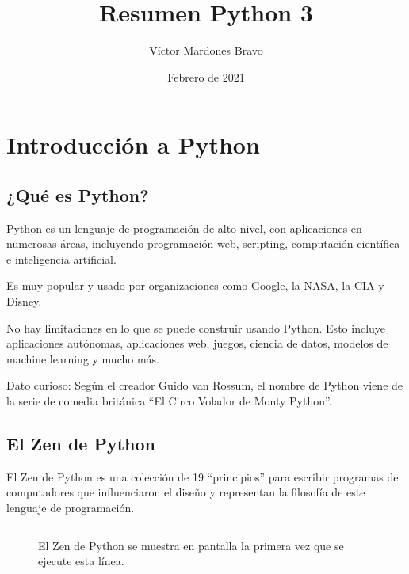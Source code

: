 \documentclass{article}
\title{Resumen Python 3}
\author{Víctor Mardones Bravo}
\date{Febrero de 2021}
\newcommand{\doble}[1]{``#1''}
\begin{document}

\null
\nointerlineskip
\vfill
\let\snewpage \newpage
\let\newpage \relax
  {\centering\def\svgwidth{\columnwidth}
  }
\maketitle
\let \newpage \snewpage
\vfill 
\break

\newpage


\section{Introducción a Python}

\subsection{¿Qué es Python?}

Python es un lenguaje de programación de alto nivel, con aplicaciones en numerosas áreas, incluyendo programación web, scripting, computación científica e inteligencia artificial.

Es muy popular y usado por organizaciones como Google, la NASA, la CIA y Disney.

No hay limitaciones en lo que se puede construir usando Python. Esto incluye aplicaciones autónomas, aplicaciones web, juegos, ciencia de datos, modelos de machine learning y mucho más.

Dato curioso: Según el creador Guido van Rossum, el nombre de Python viene de la serie de comedia británica \doble{El Circo Volador de Monty Python}.

\subsection{El Zen de Python}

El Zen de Python es una colección de 19 \doble{principios} para escribir programas de computadores que influenciaron el diseño y representan la filosofía de este lenguaje de programación.

\begin{figure}[ht!]
  \inputminted[frame=single, linenos]{python}{codigo/1-intro/import_this.py}
  \caption{El Zen de Python se muestra en pantalla la primera vez que se ejecute esta línea.}
\end{figure}
\end{document}
